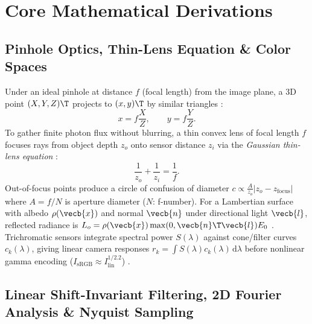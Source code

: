 \documentclass[../../../../master.tex]{subfiles}
\begin{document}
\section{Core Mathematical Derivations}

\subsection{Pinhole Optics, Thin-Lens Equation \& Color Spaces}

\begin{coremath}
Under an ideal pinhole at distance $f$ (focal length) from the image plane, a 3D point $(X, Y, Z)\T$ projects to $(x, y)\T$ by similar triangles :
\begin{equation}
  x = f \frac{X}{Z}, \qquad y = f \frac{Y}{Z}.
\end{equation}
To gather finite photon flux without blurring, a thin convex lens of focal length $f$ focuses rays from object depth $z_o$ onto sensor distance $z_i$ via the \emph{Gaussian thin-lens equation} :
\begin{equation}
  \frac{1}{z_o} + \frac{1}{z_i} = \frac{1}{f}.
\end{equation}
Out-of-focus points produce a circle of confusion of diameter $c \propto \frac{A}{z_o}|z_o - z_{\mathrm{focus}}|$ where $A = f / N$ is aperture diameter ($N$: f-number). For a Lambertian surface with albedo $\rho(\vecb{x})$ and normal $\vecb{n}$ under directional light $\vecb{l}$, reflected radiance is $L_o = \rho(\vecb{x})\max(0, \vecb{n}\T\vecb{l}) E_0$ . Trichromatic sensors integrate spectral power $S(\lambda)$ against cone/filter curves $c_k(\lambda)$, giving linear camera responses $r_k = \int S(\lambda) c_k(\lambda)\,\mathrm{d}\lambda$ before nonlinear gamma encoding ($I_{\mathrm{sRGB}} \approx I_{\mathrm{lin}}^{1/2.2}$) .
\end{coremath}

\subsection{Linear Shift-Invariant Filtering, 2D Fourier Analysis \& Nyquist Sampling}
\end{document}
